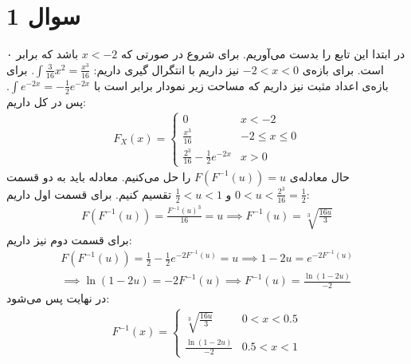 \section*{سوال 1}
در ابتدا
این تابع را بدست می‌آوریم.
برای شروع در صورتی که
$x < -2$
باشد که
برابر ۰ است. برای بازه‌ی
$-2 < x < 0$
نیز داریم با انتگرال گیری داریم:
$\int \frac{3}{16}x^2 = \frac{x^3}{16}$.
برای بازه‌ی اعداد مثبت نیز داریم که مساحت زیر نمودار
برابر است با
$\int e^{-2x} = -\frac{1}{2} e^{-2x}$.
پس در کل داریم:
\begin{gather*}
    F_X(x) = \begin{cases}
        0  & x < -2 \\
        \frac{x^3}{16} & -2 \le x \le 0\\
        \frac{2^3}{16} - \frac{1}{2} e^{-2x} & x > 0
      \end{cases}
\end{gather*}
حال معادله‌ی $F(F^{-1}(u)) = u$ را حل می‌کنیم.
معادله باید به دو قسمت
$0 < u < \frac{2^3}{16} = \frac{1}{2}$ و $\frac{1}{2} < u < 1$
تقسیم کنیم. برای قسمت اول داریم:
\begin{gather*}
    F(F^{-1}(u)) = \frac{F^{-1}(u)^3}{16} = u \implies F^{-1}(u) = \sqrt[3]{\frac{16u}{3}}
\end{gather*}
برای قسمت دوم نیز داریم:
\begin{gather*}
    F(F^{-1}(u)) = \frac{1}{2} - \frac{1}{2} e^{-2F^{-1}(u)} = u \implies 1 - 2u = e^{-2F^{-1}(u)}\\
    \implies \ln(1 - 2u) = -2F^{-1}(u) \implies F^{-1}(u) = \frac{\ln(1 - 2u)}{-2}
\end{gather*}
در نهایت پس می‌شود:
\begin{gather*}
    F^{-1}(x) = \begin{cases}
        \sqrt[3]{\frac{16u}{3}} & 0 < x < 0.5\\
        \frac{\ln(1 - 2u)}{-2} & 0.5 < x < 1
      \end{cases}
\end{gather*}
